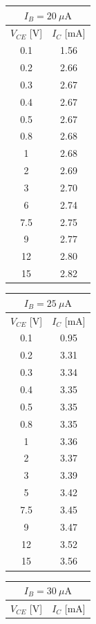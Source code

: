 \documentclass[11pt,a4paper]{jsarticle}
\begin{document}
\begin{table}[H]
\begin{minipage}{0.3\textwidth}
\centering
\small
\begin{tabular}{cc}
\toprule
\multicolumn{2}{c}{$I_B=20~\mu\mathrm{A}$}\\
\midrule
$V_{CE}$ [V] & $I_C$ [mA]\\
\midrule
0.1&1.56\\
0.2&2.66\\
0.3&2.67\\
0.4&2.67\\
0.5&2.67\\
0.8&2.68\\
1&2.68\\
2&2.69\\
3&2.70\\
6&2.74\\
7.5&2.75\\
9&2.77\\
12&2.80\\
15&2.82\\
\bottomrule
\end{tabular}
\end{minipage}
\hfill
\begin{minipage}{0.3\textwidth}
\centering
\small
\begin{tabular}{cc}
\toprule
\multicolumn{2}{c}{$I_B=25~\mu\mathrm{A}$}\\
\midrule
$V_{CE}$ [V] & $I_C$ [mA]\\
\midrule
0.1&0.95\\
0.2&3.31\\
0.3&3.34\\
0.4&3.35\\
0.5&3.35\\
0.8&3.35\\
1&3.36\\
2&3.37\\
3&3.39\\
5&3.42\\
7.5&3.45\\
9&3.47\\
12&3.52\\
15&3.56\\
\bottomrule
\end{tabular}
\end{minipage}
\hfill
\begin{minipage}{0.3\textwidth}
\centering
\small
\begin{tabular}{cc}
\toprule
\multicolumn{2}{c}{$I_B=30~\mu\mathrm{A}$}\\
\midrule
$V_{CE}$ [V] & $I_C$ [mA]\\

\end{tabular}
\end{minipage}
\end{table}
\end{document}

